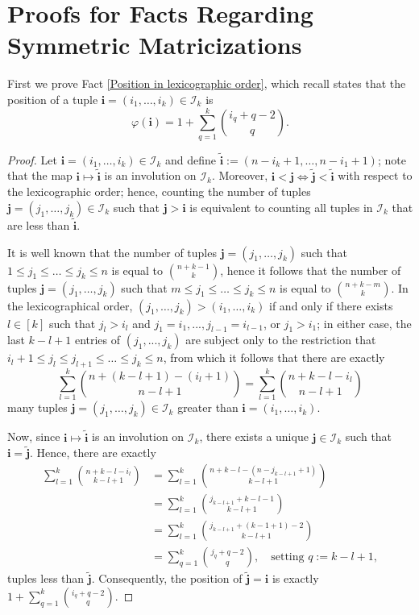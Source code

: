 \documentclass[11pt]{article}
\begin{document}
\section{Proofs for Facts Regarding Symmetric Matricizations}
First we prove Fact \ref{Position in lexicographic order}, which recall states that the position of a tuple $\mathbf{i} = (i_1,\dots,i_k)\in \mathcal{I}_k$ is 
\[\varphi(\mathbf{i}) = 1+\sum\limits_{q=1}^k\binom{i_q+q-2}{q}.\]
\begin{proof}
    Let $\mathbf{i} = (i_1,\dots,i_k)\in \mathcal{I}_k$ and define $\widetilde{\mathbf{i}} := (n-i_k+1,\dots,n-i_1+1)$; note that the map $\mathbf{i}\mapsto \widetilde{\mathbf{i}}$ is an involution on $\mathcal{I}_k$. Moreover, $\mathbf{i} < \mathbf{j} \iff \widetilde{\mathbf{j}} < \widetilde{\mathbf{i}}$ with respect to the lexicographic order; hence, counting the number of tuples $\mathbf{j} = (j_1,\dots,j_k)\in \mathcal{I}_k$ such that $\mathbf{j} > \mathbf{i}$ is equivalent to counting all tuples in $\mathcal{I}_k$ that are less than $\widetilde{\mathbf{i}}$. 

    It is well known that the number of tuples $\mathbf{j} = (j_1,\dots ,j_k)$ such that $1\leq j_1\leq\dots\leq j_k\leq n$ is equal to $\binom{n+k-1}{k}$, hence it follows that the number of tuples $\mathbf{j} = (j_1,\dots,j_k)$ such that $m\leq j_1\leq\dots\leq j_k\leq n$ is equal to $\binom{n+k-m}{k}$. In the lexicographical order, $(j_1,\dots ,j_k) > (i_1,\dots, i_k)$ if and only if there exists $l\in [k]$ such that $j_l > i_l$ and $j_1= i_1,...,j_{l-1}=i_{l-1}$, or $j_1 > i_1$; in either case, the last $k-l+1$ entries of $(j_1,...,j_k)$ are subject only to the restriction that $i_l+1 \leq j_l\leq j_{l+1}\leq\dots\leq j_k\leq n$, from which it follows that there are exactly 
    \[\sum\limits_{l=1}^k\binom{n+(k-l+1)-(i_l+1)}{n-l+1} = \sum\limits_{l=1}^k\binom{n+k-l-i_l}{n-l+1}\] 
    many tuples $\mathbf{j} = (j_1,\dots,j_k)\in \mathcal{I}_k$ greater than $\mathbf{i} = (i_1,\dots ,i_k)$. 

    Now, since $\mathbf{i}\mapsto \widetilde{\mathbf{i}}$ is an involution on $\mathcal{I}_k$, there exists a unique $\mathbf{j}\in \mathcal{I}_k$ such that $\mathbf{i} = \widetilde{\mathbf{j}}$. Hence, there are exactly 
    \begin{align*}
        \sum\limits_{l=1}^k\binom{n+k-l-i_l}{k-l+1} &= \sum\limits_{l=1}^k\binom{n+k-l-(n-j_{k-l+1}+1)}{k-l+1} \\
        &= \sum\limits_{l=1}^k\binom{j_{k-l+1}+k-l-1}{k-l+1} \\
        &= \sum\limits_{l=1}^k\binom{j_{k-l+1}+(k-1+1)-2}{k-l+1} \\
        &= \sum\limits_{q=1}^k\binom{j_q+q-2}{q},\quad \text{setting }q:=k-l+1,
    \end{align*}
    tuples less than $\widetilde{\mathbf{j}}$. Consequently, the position of $\widetilde{\mathbf{j}} = \mathbf{i}$ is exactly $1+\sum\limits_{q=1}^k\binom{i_q+q-2}{q}$.  
\end{proof}
\end{document}
